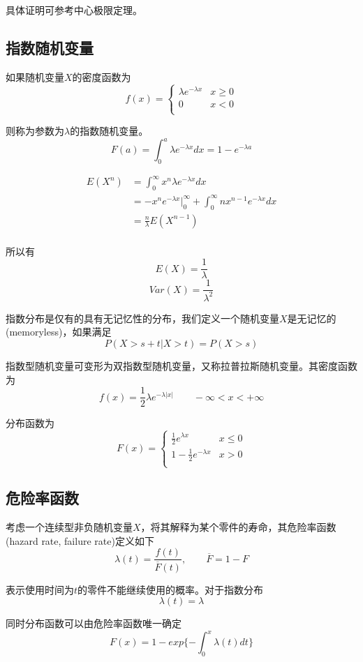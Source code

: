 \documentclass[UTF8]{ctexart}
\begin{document}
具体证明可参考中心极限定理。

\subsection{指数随机变量}

如果随机变量$X$的密度函数为
$$f(x)=\left\{ 
\begin{array}{ll}
\lambda e^{-\lambda x} &x \geq 0\\
0 &x<0\\
\end{array} 
\right. $$

则称为参数为$\lambda$的指数随机变量。
$$F(a)=\int_{0}^{a}\lambda e^{-\lambda x}dx=1-e^{-\lambda a} $$

$$\begin{aligned}
E(X^{n})&=\int_{0}^{\infty }x^{n}\lambda e^{-\lambda x}dx\\
&=-x^{n}e^{-\lambda x}\Big|_{0}^{\infty }+\int_{0}^{\infty }nx^{n-1}e^{-\lambda x}dx\\
&=\frac{n}{\lambda }E(X^{n-1})\\
\end{aligned} $$

所以有
$$E(X)=\frac{1}{\lambda } $$
$$Var(X)=\frac{1}{\lambda^{2}} $$

指数分布是仅有的具有无记忆性的分布，我们定义一个随机变量$X$是无记忆的(memoryless)，如果满足
$$P(X>s+t|X>t)=P(X>s) $$

指数型随机变量可变形为双指数型随机变量，又称拉普拉斯随机变量。其密度函数为
$$f(x)=\frac{1}{2}\lambda e^{-\lambda |x|}\qquad -\infty <x<+\infty $$

分布函数为
$$ F(x)=\left\{ 
\begin{array}{ll}
\frac{1}{2}e^{\lambda x} &x\leq 0\\
1-\frac{1}{2}e^{-\lambda x} &x>0\\
\end{array}
\right. $$

\subsection{危险率函数}

考虑一个连续型非负随机变量$X$，将其解释为某个零件的寿命，其危险率函数(hazard rate, failure rate)定义如下
$$\lambda (t)=\frac{f(t)}{\overline{F}(t)},\qquad \overline{F}=1-F $$

表示使用时间为$t$的零件不能继续使用的概率。对于指数分布
$$\lambda (t)=\lambda $$

同时分布函数可以由危险率函数唯一确定
$$F(x)=1-exp\{-\int_{0}^{x}\lambda (t)dt\} $$
\end{document}
